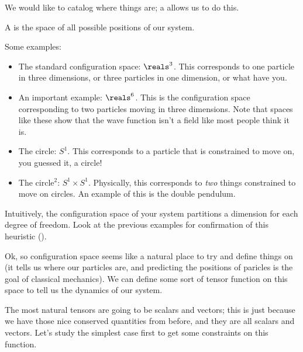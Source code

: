\documentclass[11pt]{article}
\begin{document}
We would like to catalog where things are; a 
allows us to do this.

\begin{ddefinition}
    A  is the space of all possible positions
    of our system.
\end{ddefinition}

\begin{eexample}
    Some examples:
    \begin{itemize}
        \item The standard configuration space: $\reals^3$. This corresponds
        to one particle in three dimensions, or three particles in one dimension,
        or what have you.
        \item An important example: $\reals^6$. This is the configuration
        space corresponding to two particles moving in three dimensions.
        Note that spaces like these show that the wave function isn't 
        a field like most people think it is.
        \item The circle: $S^1$. This corresponds to a particle that
        is constrained to move on, you guessed it, a circle!
        \item The circle$^2$: $S^1 \times S^1$. Physically, this corresponds
        to \emph{two} things constrained to move on circles. An example of this
        is the double pendulum.
    \end{itemize}
\end{eexample}

\begin{reemark}
    Intuitively, the configuration space of your system partitions
    a dimension for each degree of freedom. Look at the previous examples
    for confirmation of this heuristic ().
\end{reemark}

Ok, so configuration space seems like a natural place to try and
define things on (it tells us where our particles are, and predicting
the positions of paricles is the goal of classical mechanics). We can
define some sort of tensor function on this space to tell us the dynamics
of our system. 

The most natural tensors are going to be scalars and vectors;
this is just because we have those nice conserved quantities
from before, and they are all scalars and vectors. Let's study
the simplest case first to get some constraints on this function.
\end{document}
